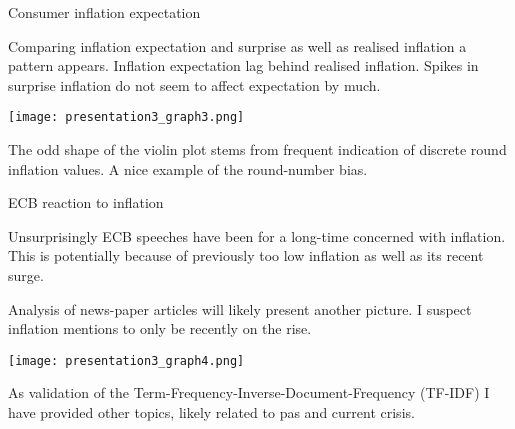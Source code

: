 \documentclass[9pt]{beamer}
\begin{document}
	\begin{frame}{Consumer inflation expectation}
		
	Comparing inflation expectation and surprise as well as realised inflation a pattern appears. Inflation expectation lag behind realised inflation. 
	Spikes in surprise inflation do not seem to affect expectation by much.
		\begin{center}
			\texttt{[image: presentation3\_graph3.png]}
		\end{center}
	The odd shape of the violin plot stems from frequent indication of discrete round inflation values. A nice example of the round-number bias.
	
	\end{frame}

	
	\begin{frame}{ECB reaction to inflation}
	
	Unsurprisingly ECB speeches have been for a long-time concerned with inflation. This is potentially because of previously too low inflation as well as its recent surge.
	
	Analysis of news-paper articles will likely present another picture. I suspect inflation mentions to only be recently on the rise. 
		\begin{center}
			\texttt{[image: presentation3\_graph4.png]}
		\end{center}
	
	As validation of the Term-Frequency-Inverse-Document-Frequency (TF-IDF) I have provided other topics, likely related to pas and current crisis.
	\end{frame}
\end{document}
